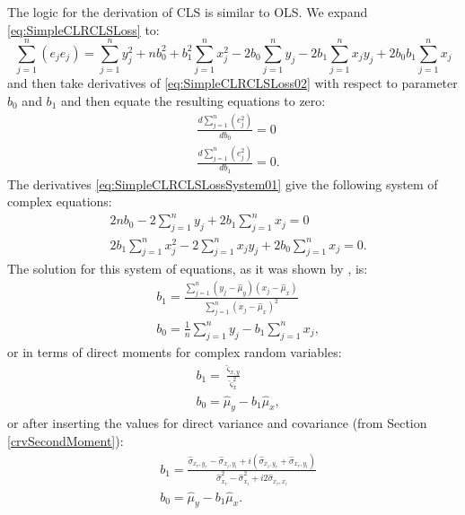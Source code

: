 \documentclass[
]{book}
\begin{document}
The logic for the derivation of CLS is similar to OLS. We expand \eqref{eq:SimpleCLRCLSLoss} to:
\begin{equation}
    \sum_{j=1}^n (e_j e_j) = \sum_{j=1}^n y_j^2 + n b_0^2 + b_1^2 \sum_{j=1}^n x_j^2 - 2 b_0 \sum_{j=1}^n y_j - 2 b_1 \sum_{j=1}^n x_j y_j + 2 b_0 b_1 \sum_{j=1}^n x_j 
    \label{eq:SimpleCLRCLSLoss02}
\end{equation}
and then take derivatives of \eqref{eq:SimpleCLRCLSLoss02} with respect to parameter \(b_0\) and \(b_1\) and then equate the resulting equations to zero:
\begin{equation}
    \begin{aligned}
        & \frac{d \sum_{j=1}^n (e_j^2)}{d b_{0}} = 0 \\
        & \frac{d \sum_{j=1}^n (e_j^2)}{d b_{1}} = 0 .
    \end{aligned}
    \label{eq:SimpleCLRCLSLossSystem01}
\end{equation}
The derivatives \eqref{eq:SimpleCLRCLSLossSystem01} give the following system of complex equations:
\begin{equation}
    \begin{aligned}
        & 2 n b_0 - 2 \sum_{j=1}^n y_j + 2 b_1 \sum_{j=1}^n x_j = 0 \\
        & 2 b_1 \sum_{j=1}^n x_j^2 - 2 \sum_{j=1}^n x_j y_j + 2 b_0 \sum_{j=1}^n x_j = 0 .
    \end{aligned}
    \label{eq:SimpleCLRCLSLossSystem02}
\end{equation}
The solution for this system of equations, as it was shown by \citet{Svetunkov2012}, is:
\begin{equation}
    \begin{aligned}
        & b_{1} = \frac{\sum_{j=1}^n (y_{j}-\hat{\mu}_{y}) ({x}_j-\hat{\mu}_{x})}{\sum_{j=1}^n (x_{j}-\hat{\mu}_{x})^2} \\
        & b_0 = \frac{1}{n} \sum_{j=1}^n y_j - b_1 \sum_{j=1}^n x_j ,
    \end{aligned}
    \label{eq:SimpleCLRCLSLossParameters}
\end{equation}
or in terms of direct moments for complex random variables:
\begin{equation}
    \begin{aligned}
        & b_{1} = \frac{\hat{\varsigma}_{x,y}}{\hat{\varsigma}_x^2} \\
        & b_0 = \hat{\mu}_{y} - b_1 \hat{\mu}_{x} ,
    \end{aligned}
    \label{eq:SimpleCLRCLSLossParametersMoments}
\end{equation}
or after inserting the values for direct variance and covariance (from Section \ref{crvSecondMoment}):
\begin{equation}
    \begin{aligned}
        & b_{1} = \frac{\hat{\sigma}_{x_r, y_r} - \hat{\sigma}_{x_i, y_i} + i (\hat{\sigma}_{x_i, y_r} + \hat{\sigma}_{x_r, y_i})}{\hat{\sigma}_{x_r}^2 - \hat{\sigma}_{x_i}^2 + i2 \hat{\sigma}_{x_r,x_i}} \\
        & b_0 = \hat{\mu}_{y} - b_1 \hat{\mu}_{x} .
    \end{aligned}
    \label{eq:SimpleCLRCLSLossParametersMomentsExpanded}
\end{equation}
\end{document}
